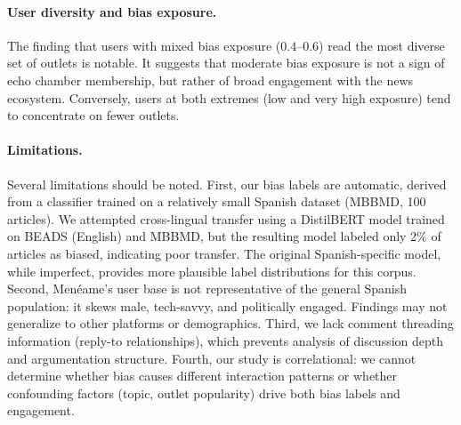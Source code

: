 \paragraph{User diversity and bias exposure.}
The finding that users with mixed bias exposure ($0.4$--$0.6$) read the most diverse set of outlets is notable.
It suggests that moderate bias exposure is not a sign of echo chamber membership, but rather of broad engagement with the news ecosystem.
Conversely, users at both extremes (low and very high exposure) tend to concentrate on fewer outlets.

\paragraph{Limitations.}
Several limitations should be noted.
First, our bias labels are automatic, derived from a classifier trained on a relatively small Spanish dataset (MBBMD, 100 articles).
We attempted cross-lingual transfer using a DistilBERT model trained on BEADS (English) and MBBMD, but the resulting model labeled only 2\% of articles as biased, indicating poor transfer.
The original Spanish-specific model, while imperfect, provides more plausible label distributions for this corpus.
Second, Men\'eame's user base is not representative of the general Spanish population: it skews male, tech-savvy, and politically engaged.
Findings may not generalize to other platforms or demographics.
Third, we lack comment threading information (reply-to relationships), which prevents analysis of discussion depth and argumentation structure.
Fourth, our study is correlational: we cannot determine whether bias causes different interaction patterns or whether confounding factors (topic, outlet popularity) drive both bias labels and engagement.
